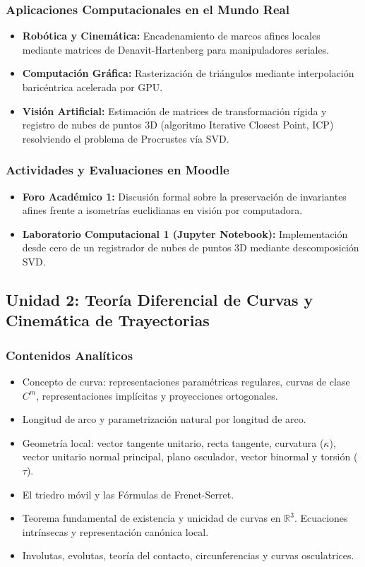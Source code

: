 \documentclass[11pt, a4paper]{article}
\begin{document}
	\subsubsection*{Aplicaciones Computacionales en el Mundo Real}
	\begin{itemize}
		\item \textbf{Robótica y Cinemática:} Encadenamiento de marcos afines locales mediante matrices de Denavit-Hartenberg para manipuladores seriales.
		\item \textbf{Computación Gráfica:} Rasterización de triángulos mediante interpolación baricéntrica acelerada por GPU.
		\item \textbf{Visión Artificial:} Estimación de matrices de transformación rígida y registro de nubes de puntos 3D (algoritmo Iterative Closest Point, ICP) resolviendo el problema de Procrustes vía SVD.
	\end{itemize}
	
	\subsubsection*{Actividades y Evaluaciones en Moodle}
	\begin{itemize}
		\item \textbf{Foro Académico 1:} Discusión formal sobre la preservación de invariantes afines frente a isometrías euclidianas en visión por computadora.
		\item \textbf{Laboratorio Computacional 1 (Jupyter Notebook):} Implementación desde cero de un registrador de nubes de puntos 3D mediante descomposición SVD.
	\end{itemize}
	
	\subsection{Unidad 2: Teoría Diferencial de Curvas y Cinemática de Trayectorias}
	
	\subsubsection*{Contenidos Analíticos}
	\begin{itemize}
		\item Concepto de curva: representaciones paramétricas regulares, curvas de clase $C^m$, representaciones implícitas y proyecciones ortogonales.
		\item Longitud de arco y parametrización natural por longitud de arco.
		\item Geometría local: vector tangente unitario, recta tangente, curvatura ($\kappa$), vector unitario normal principal, plano osculador, vector binormal y torsión ($\tau$).
		\item El triedro móvil y las Fórmulas de Frenet-Serret.
		\item Teorema fundamental de existencia y unicidad de curvas en $\mathbb{R}^3$. Ecuaciones intrínsecas y representación canónica local.
		\item Involutas, evolutas, teoría del contacto, circunferencias y curvas osculatrices.
	\end{itemize}
	
\end{document}
